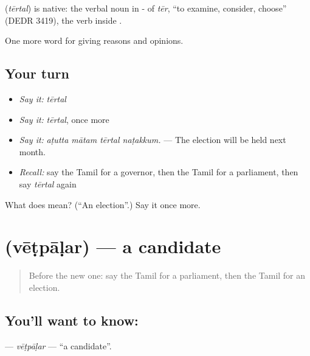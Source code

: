 \begin{cousinweb}
\textbf{} (\emph{tērtal}) is native: the verbal noun in - of \emph{tēr}, \textquotedblleft{}to examine, consider, choose\textquotedblright{} (DEDR 3419), the verb inside .
\end{cousinweb}

\begin{grammarlens}[title={What you've built}]
One more word for giving reasons and opinions.
\end{grammarlens}

\subsection*{Your turn}
\begin{itemize}
\raggedright
  \item \emph{Say it:} \emph{tērtal}
  \item \emph{Say it:} \emph{tērtal}, once more
  \item \emph{Say it:} \emph{aṭutta mātam tērtal naṭakkum.} — The election will be held next month.
  \item \emph{Recall:} say the Tamil for a governor, then the Tamil for a parliament, then say \emph{tērtal} again
\end{itemize}

\begin{tcolorbox}[breakable,colback=teal!4,colframe=teal!35!black,title={Before you move on}]
What does  mean? (\textquotedblleft{}An election\textquotedblright{}.) Say it once more.
\end{tcolorbox}
\section[\texorpdfstring{\ta{வேட்பாளர்} (vēṭpāḷar)}{வேட்பாளர் (vēṭpāḷar)}]{ (vēṭpāḷar) — a candidate}

\label{lesson:TA-C374-vetpalar}



\begin{quote}
Before the new one: say the Tamil for a parliament, then the Tamil for an election.
\end{quote}

\subsection*{You'll want to know: }
\textbf{} — \emph{vēṭpāḷar} — \textquotedblleft{}a candidate\textquotedblright{}.

